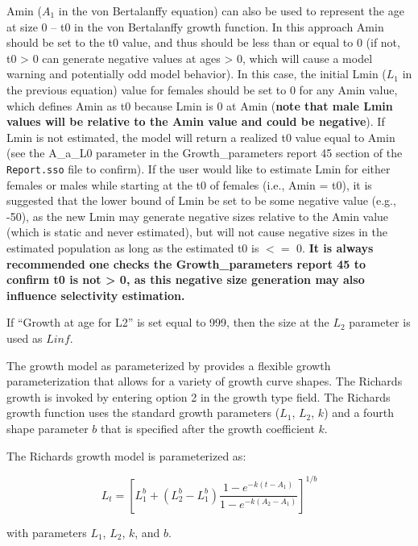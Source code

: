 Amin ($A_{1}$ in the von Bertalanffy equation) can also be used to represent the age at size 0 -- t0 in the von Bertalanffy growth function. In this approach Amin should be set to the t0 value, and thus should be less than or equal to 0 (if not, t0 > 0 can generate negative values at ages > 0, which will cause a model warning and potentially odd model behavior). In this case, the initial Lmin ($L_{1}$ in the previous equation) value for females should be set to 0 for any Amin value, which defines Amin as t0 because Lmin is 0 at Amin (\textbf{note that male Lmin values will be relative to the Amin value and could be negative}). If Lmin is not estimated, the model will return a realized t0 value equal to Amin (see the A\_a\_L0 parameter in the Growth\_parameters report 45 section of the \texttt{Report.sso} file to confirm). If the user would like to estimate Lmin for either females or males while starting at the t0 of females (i.e., Amin = t0), it is suggested that the lower bound of Lmin be set to be some negative value (e.g., -50), as the new Lmin may generate negative sizes relative to the Amin value (which is static and never estimated), but will not cause negative sizes in the estimated population as long as the estimated t0 is $<=$ 0. \textbf{It is always recommended one checks the Growth\_parameters report 45 to confirm t0 is not > 0, as this negative size generation may also influence selectivity estimation.}
	
If ``Growth at age for L2'' is set equal to 999, then the size at the $L_2$ parameter is used as $Linf$. 

The \citet{richards1959growth} growth model as parameterized by \citet{schnute1981growth} provides a flexible growth parameterization that allows for a variety of growth curve shapes. The Richards growth is invoked by entering option 2 in the growth type field. The Richards growth function uses the standard growth parameters ($L_1$, $L_2$, $k$) and a fourth shape parameter $b$ that is specified after the growth coefficient $k$.

The Richards growth model is parameterized as:

\begin{equation}
	L_t = \left[L_1^b + (L_2^b-L_1^b)\frac{1-e^{-k(t-A_{1})}}{1-e^{-k(A_2-A_1)}}\right]^{1/b}
\end{equation}

with parameters $L_1$, $L_2$, $k$, and $b$.

